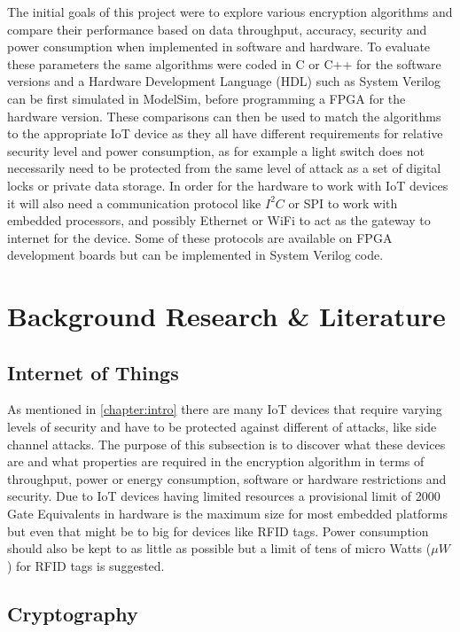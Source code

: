 \documentclass[12pt,twoside,a4paper]{report}
\begin{document}
	The initial goals of this project were to explore various encryption algorithms and compare their performance based on data throughput, accuracy, security and power consumption when implemented in software and hardware. To evaluate these parameters the same algorithms were coded in C or C++ for the software versions and a Hardware Development Language (HDL) such as System Verilog can be first simulated in ModelSim, before programming a FPGA for the hardware version. These comparisons can then be used to match the algorithms to the appropriate IoT device as they all have different requirements for relative security level and power consumption, as for example a light switch does not necessarily need to be protected from the same level of attack as a set of digital locks or private data storage. In order for the hardware to work with IoT devices it will also need a communication protocol like $I^2 C$ or SPI to work with embedded processors, and possibly Ethernet or WiFi to act as the gateway to internet for the device. Some of these protocols are available on FPGA development boards but can be implemented in System Verilog code.
    
	\chapter{Background Research \& Literature}
	\label{chapter:BACK}
    
	\section{Internet of Things}
	\label{section:IoT}
    
	As mentioned in \autoref{chapter:intro} there are many IoT devices that require varying levels of security and have to be protected against different of attacks, like side channel attacks. The purpose of this subsection is to discover what these devices are and what properties are required in the encryption algorithm in terms of throughput, power or energy consumption, software or hardware restrictions and security. Due to IoT devices having limited resources a provisional limit of 2000 Gate Equivalents in hardware is the maximum size for most embedded platforms but even that might be to big for devices like RFID tags\cite{Juels2005}. Power consumption should also be kept to as little as possible but a limit of tens of micro Watts ($\mu W$) for RFID tags is suggested\cite{David2011}.
    
	\section{Cryptography}
	\label{section:crypt}
    
\end{document}
